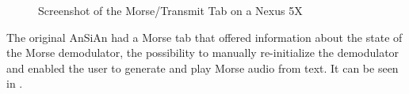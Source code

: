 \begin{figure}
\centering
{}
\hfill\null
{}
\caption{Screenshot of the Morse/Transmit Tab on a Nexus 5X}
\label{fig:transmit_tab}
\end{figure}

The original \ac{AnSiAn} had a Morse tab that offered information about the state of the Morse demodulator, the possibility to manually re-initialize the demodulator and enabled the user to generate and play Morse audio from text. It can be seen in \label{fig:transmit_tab_old}.

